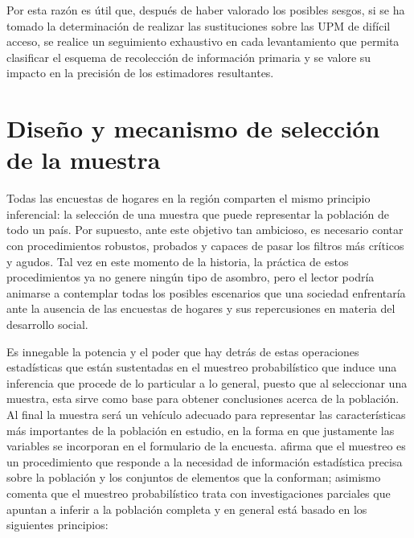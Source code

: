\documentclass[
  12pt,
  spanish,
]{book}
\begin{document}
Por esta razón es útil que, después de haber valorado los posibles sesgos, si se ha tomado la determinación de realizar las sustituciones sobre las UPM de difícil acceso, se realice un seguimiento exhaustivo en cada levantamiento que permita clasificar el esquema de recolección de información primaria y se valore su impacto en la precisión de los estimadores resultantes.

\hypertarget{diseuxf1o-y-mecanismo-de-selecciuxf3n-de-la-muestra}{%
\chapter{Diseño y mecanismo de selección de la muestra}\label{diseuxf1o-y-mecanismo-de-selecciuxf3n-de-la-muestra}}

Todas las encuestas de hogares en la región comparten el mismo principio inferencial: la selección de una muestra que puede representar la población de todo un país. Por supuesto, ante este objetivo tan ambicioso, es necesario contar con procedimientos robustos, probados y capaces de pasar los filtros más críticos y agudos. Tal vez en este momento de la historia, la práctica de estos procedimientos ya no genere ningún tipo de asombro, pero el lector podría animarse a contemplar todas los posibles escenarios que una sociedad enfrentaría ante la ausencia de las encuestas de hogares y sus repercusiones en materia del desarrollo social.

Es innegable la potencia y el poder que hay detrás de estas operaciones estadísticas que están sustentadas en el muestreo probabilístico que induce una inferencia que procede de lo particular a lo general, puesto que al seleccionar una muestra, esta sirve como base para obtener conclusiones acerca de la población. Al final la muestra será un vehículo adecuado para representar las características más importantes de la población en estudio, en la forma en que justamente las variables se incorporan en el formulario de la encuesta. \citet{Gutierrez_2016} afirma que el muestreo es un procedimiento que responde a la necesidad de información estadística precisa sobre la población y los conjuntos de elementos que la conforman; asimismo comenta que el muestreo probabilístico trata con investigaciones parciales que apuntan a inferir a la población completa y en general está basado en los siguientes principios:
\end{document}
